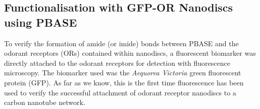 \documentclass[
  a4paper,
]{scrbook}
\begin{document}
\hypertarget{sec-PBASE-GFP-OR-attachment}{%
\subsection{Functionalisation with GFP-OR Nanodiscs using
PBASE}\label{sec-PBASE-GFP-OR-attachment}}

To verify the formation of amide (or imide) bonds between PBASE and the
odorant receptors (ORs) contained within nanodiscs, a fluorescent
biomarker was directly attached to the odorant receptors for detection
with fluorescence microscopy. The biomarker used was the \emph{Aequorea
Victoria} green fluorescent protein (GFP). As far as we know, this is
the first time fluorescence has been used to verify the successful
attachment of odorant receptor nanodiscs to a carbon nanotube network.
\end{document}
